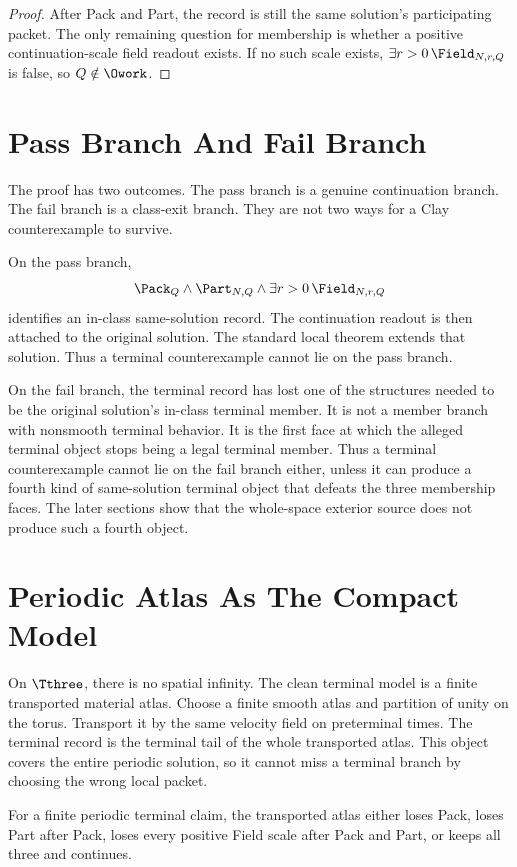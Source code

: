 \begin{proof}
After Pack and Part, the record is still the same solution's participating packet.
The only remaining question for membership is whether a positive continuation-scale field readout exists.
If no such scale exists, \(\exists r>0\,\Field_{N,r,Q}\) is false, so \(Q\notin\Owork\).
\end{proof}

\section{Pass Branch And Fail Branch}

The proof has two outcomes.
The pass branch is a genuine continuation branch.
The fail branch is a class-exit branch.
They are not two ways for a Clay counterexample to survive.

On the pass branch,
\[
  \Pack_Q\wedge\Part_{N,Q}\wedge\exists r>0\,\Field_{N,r,Q}
\]
identifies an in-class same-solution record.
The continuation readout is then attached to the original solution.
The standard local theorem extends that solution.
Thus a terminal counterexample cannot lie on the pass branch.

On the fail branch, the terminal record has lost one of the structures needed to be the original solution's in-class terminal member.
It is not a member branch with nonsmooth terminal behavior.
It is the first face at which the alleged terminal object stops being a legal terminal member.
Thus a terminal counterexample cannot lie on the fail branch either, unless it can produce a fourth kind of same-solution terminal object that defeats the three membership faces.
The later sections show that the whole-space exterior source does not produce such a fourth object.

\section{Periodic Atlas As The Compact Model}

On \(\Tthree\), there is no spatial infinity.
The clean terminal model is a finite transported material atlas.
Choose a finite smooth atlas and partition of unity on the torus.
Transport it by the same velocity field on preterminal times.
The terminal record is the terminal tail of the whole transported atlas.
This object covers the entire periodic solution, so it cannot miss a terminal branch by choosing the wrong local packet.

\begin{proposition}
For a finite periodic terminal claim, the transported atlas either loses Pack, loses Part after Pack, loses every positive Field scale after Pack and Part, or keeps all three and continues.
\end{proposition}

